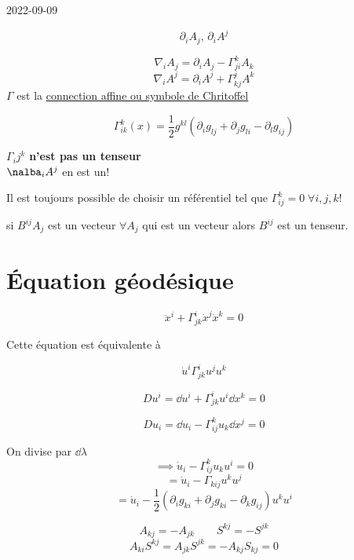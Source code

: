 


2022-09-09

\begin{tcolorbox}[title=À l'épisode précédent:]
	
$$\partial_i A_j, \, \partial_i A^j$$ 

$$\nabla_i A_j = \partial_i A_j - \Gamma_{ji}^{k}A_k$$ 
$$\nabla_i A^{j}= \partial_i A^{j}+ \Gamma_{kj}^{j}A^{k}$$ 
$\Gamma$ est la \underline{connection affine ou symbole de Chritoffel}  
	
$$\Gamma_{ik}^{k}(x) = \frac{1}{2} g^{kl} \left( \partial_i g_{lj} + \partial_j g_{li} - \partial_l g_{ij}  \right) $$ 


\begin{tcolorbox}[title=]
	$\Gamma_ij^{k}$ \textbf{n'est pas un tenseur}\\
	$\nalba_i A^j$ en est un!
\end{tcolorbox}

Il est toujours possible de choisir un référentiel tel que  $\Gamma_{ij}^{k}= 0\; \forall i,j,k$!  
\end{tcolorbox}


\begin{tcolorbox}[title=Théorème du quotient]
si 	$B^{ij}A_j $ est un vecteur $\forall A_j$ qui est un vecteur alors $B^{ij}$ est un tenseur.   
		 
\end{tcolorbox}

\section*{Équation géodésique}
$$\ddot x^{i} + \Gamma_{jk}^{i}\dot x^{j}\dot x^{k} =0$$ 

Cette équation est équivalente à 

$$\dot u^{i}\Gamma_{jk}^{i}u^{j}u^{k}$$ 

$$Du^{i}= \dd u^{i}+ \Gamma_{jk}^{i}u^{i}\dd x^{k}= 0$$ 

$$Du_i=  \dd u_i- \Gamma_{ij}^{k}u_k\dd x^{j}= 0$$ 

On divise par $\dd \lambda$ 
$$\implies \dot u_i - \Gamma_{ij}^{k} u_k u^{i}= 0$$ 
$$= \dot u_i - \Gamma_{kij} u^{k}u^j$$ 
$$=\dot u_i - \frac{1}{2} \left( \partial_i g_{ki} + \partial_j g_{ki} -\partial_k g_{ij}  \right)u^{k}u^{i} $$ 

\begin{tcolorbox}[title=]
	$$A_{kj} = -A_{jk} \qquad S^{kj}=-S^{jk}$$ 
	$$A_{ki} S^{kj}= A_{jk} S^{jk} = -A_{kj} S_{kj} =0$$ 
\end{tcolorbox}

